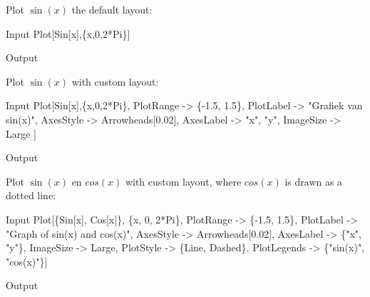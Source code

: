 \begin{example}
	Plot $\sin(x)$ the default layout: 
\begin{mdframed}[default,backgroundcolor=gray!40,roundcorner=8pt]

	\begin{mmaCell}[functionlocal = {x}]{Input}
		Plot[Sin[x],\{x,0,2*Pi\}]
	\end{mmaCell}
	\begin{mmaCell}[moregraphics={moreig={scale=.4}}]{Output}
	\end{mmaCell}
\end{mdframed}
	Plot $\sin(x)$ with custom layout:
	
\begin{mdframed}[default,backgroundcolor=gray!40,roundcorner=8pt]
	\begin{mmaCell}[functionlocal = {x},moredefined = {PlotLegends,Arrowheads,Large,Dashed}]{Input}
		Plot[Sin[x],\{x,0,2*Pi\},
		PlotRange -> \{-1.5, 1.5\},
		PlotLabel -> "Grafiek van sin(x)",
		AxesStyle -> Arrowheads[0.02],
		AxesLabel -> {"x", "y"},
		ImageSize -> Large ]
	\end{mmaCell}
	\begin{mmaCell}[moregraphics={moreig={scale=.4}}]{Output}
	\end{mmaCell}
\end{mdframed}
	Plot $\sin(x)$ en $cos(x)$ with custom layout, where $cos(x)$ is drawn as a dotted line:
	
\begin{mdframed}[default,backgroundcolor=gray!40,roundcorner=8pt]
	\begin{mmaCell}[functionlocal = {x},moredefined = {PlotLegends,Arrowheads,Large,Dashed}]{Input}
		Plot[\{Sin[x], Cos[x]\}, \{x, 0, 2*Pi\},
		PlotRange -> \{-1.5, 1.5\},
		PlotLabel -> "Graph of sin(x) and cos(x)",
		AxesStyle -> Arrowheads[0.02],
		AxesLabel -> \{"x", "y"\},
		ImageSize -> Large,
		PlotStyle -> \{Line, Dashed\},
		PlotLegends -> \{"sin(x)", "cos(x)"\}]
	\end{mmaCell}
	\begin{mmaCell}[moregraphics={moreig={scale=.4}}]{Output}
	\end{mmaCell}
\end{mdframed}


\end{example}

